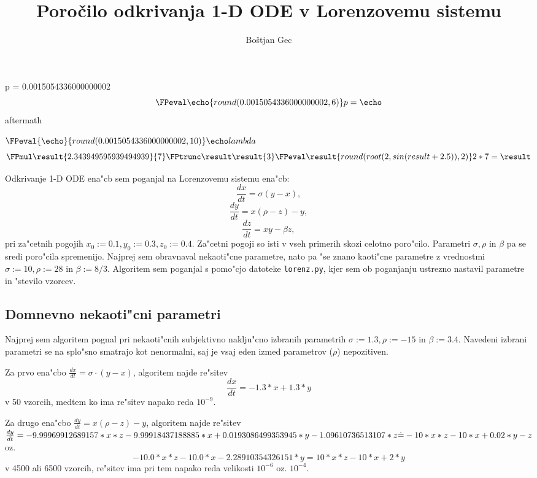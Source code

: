 \documentclass[10pt,a4paper]{article}
\title{Poročilo odkrivanja 1-D ODE v Lorenzovemu sistemu}
\author{Boštjan Gec}
\begin{document}
	\maketitle
    

\newcommand{\eqiIp}{0.0015054336000000002}
\newcommand{\eqiiIp}{ 6.50962591625742e-09}
 \newcommand{\eqiiiIp}{0.0004094779392000001}

p = \eqiIp \\
\[ \FPeval\echo{round(\eqiIp,6)} 
p = \echo \]
aftermath

 \( \FPeval{ \echo }{round(\eqiIp, 10)} \echo lambda \)
\[
\FPmul\result{2.343949595939494939}{7}
\FPtrunc\result\result{3}
\FPeval\result{round(root(2,sin(result + 2.5)),2)}
2*7 = \result
\]

Odkrivanje 1-D ODE ena"cb sem poganjal na Lorenzovemu sistemu ena"cb:
$$
\frac{dx}{dt} = \sigma (y-x),
$$ $$
\frac{dy}{dt} = x(\rho-z) - y,
$$ $$
\frac{dz}{dt} = xy - \beta z,
$$
pri za"cetnih pogojih $x_0:=0.1, y_0:=0.3, z_0:=0.4$.
Za"cetni pogoji so isti v vseh primerih skozi celotno poro"cilo.
Parametri $\sigma, \rho$ in $\beta$ pa se sredi poro"cila
spremenijo. Najprej sem obravnaval nekaoti"cne parametre, nato 
pa "se znano kaoti"cne parametre z vrednostmi
$\sigma:=10, \rho:=28$ in $\beta:=8/3$.
Algoritem sem poganjal s pomo"cjo datoteke \verb|lorenz.py|, kjer sem ob poganjanju
ustrezno nastavil parametre in "stevilo vzorcev.

\subsection{Domnevno nekaoti"cni parametri}
Najprej sem algoritem pognal pri nekaoti"cnih subjektivno naklju"cno izbranih parametrih
$\sigma:=1.3, \rho:=-15$ in $\beta:=3.4$.
Navedeni izbrani parametri se na splo"sno smatrajo kot nenormalni, saj je vsaj eden izmed parametrov
($\rho$) nepozitiven.

Za prvo ena"cbo $\frac{dx}{dt} = \sigma \cdot(y-x)$, algoritem najde re"sitev 
$$\frac{dx}{dt} =  -1.3*x + 1.3*y$$ 
v 50 vzorcih, medtem ko ima re"sitev napako reda $10^{-9}$.

Za drugo ena"cbo 
$\frac{dy}{dt} = x(\rho-z) - y$,
algoritem najde re"sitev  \\
$\frac{dy}{dt} = -9.99969912689157*x*z - 9.99918437188885*x 
+ 0.0193086499353945*y - 1.09610736513107*z \\ 
\dot{=} -10*x*z -10*x +0.02*y -z $
\enspace oz. $$-10.0*x*z - 10.0*x - 2.28910354326151*y = 10*x*z -10*x +2*y$$ v 
4500 ali 6500 vzorcih, re"sitev ima pri tem napako 
reda velikosti $10^{-6}$ oz. $10^{-4}$. 
\end{document}
